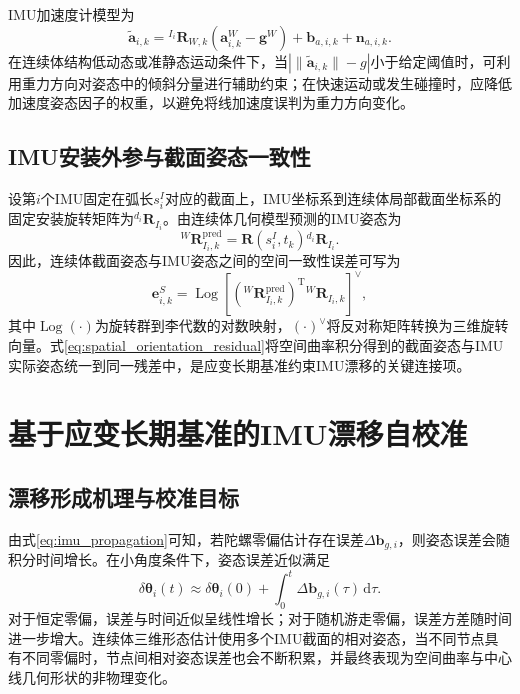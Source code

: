 IMU加速度计模型为
\begin{equation}
    \tilde{\bm a}_{i,k}
    ={}^{I_i}\bm R_{W,k}
    \left(\bm a_{i,k}^{W}-\bm g^{W}\right)
    +\bm b_{a,i,k}+\bm n_{a,i,k}.
    \label{eq:accelerometer_model}
\end{equation}
在连续体结构低动态或准静态运动条件下，当$\left|\|\tilde{\bm a}_{i,k}\|-g\right|$小于给定阈值时，可利用重力方向对姿态中的倾斜分量进行辅助约束；在快速运动或发生碰撞时，应降低加速度姿态因子的权重，以避免将线加速度误判为重力方向变化。

\subsection{IMU安装外参与截面姿态一致性}

设第$i$个IMU固定在弧长$s_i^I$对应的截面上，IMU坐标系到连续体局部截面坐标系的固定安装旋转矩阵为${}^{d_i}\bm R_{I_i}$。由连续体几何模型预测的IMU姿态为
\begin{equation}
    {}^{W}\bm R_{I_i,k}^{\mathrm{pred}}
    =\bm R(s_i^I,t_k){}^{d_i}\bm R_{I_i}.
    \label{eq:predicted_imu_orientation}
\end{equation}
因此，连续体截面姿态与IMU姿态之间的空间一致性误差可写为
\begin{equation}
    \bm e_{i,k}^{S}
    =\operatorname{Log}\left[
    \left({}^{W}\bm R_{I_i,k}^{\mathrm{pred}}\right)^{\mathrm T}
    {}^{W}\bm R_{I_i,k}
    \right]^{\vee},
    \label{eq:spatial_orientation_residual}
\end{equation}
其中$\operatorname{Log}(\cdot)$为旋转群到李代数的对数映射，$(\cdot)^{\vee}$将反对称矩阵转换为三维旋转向量。式\eqref{eq:spatial_orientation_residual}将空间曲率积分得到的截面姿态与IMU实际姿态统一到同一残差中，是应变长期基准约束IMU漂移的关键连接项。

\section{基于应变长期基准的IMU漂移自校准}
\label{sec:strain_referenced_drift_calibration}

\subsection{漂移形成机理与校准目标}

由式\eqref{eq:imu_propagation}可知，若陀螺零偏估计存在误差$\Delta\bm b_{g,i}$，则姿态误差会随积分时间增长。在小角度条件下，姿态误差近似满足
\begin{equation}
    \delta\bm\theta_{i}(t)
    \approx \delta\bm\theta_i(0)
    +\int_{0}^{t}\Delta\bm b_{g,i}(\tau)\,\mathrm d\tau.
    \label{eq:attitude_drift_approx}
\end{equation}
对于恒定零偏，误差与时间近似呈线性增长；对于随机游走零偏，误差方差随时间进一步增大。连续体三维形态估计使用多个IMU截面的相对姿态，当不同节点具有不同零偏时，节点间相对姿态误差也会不断积累，并最终表现为空间曲率与中心线几何形状的非物理变化。


